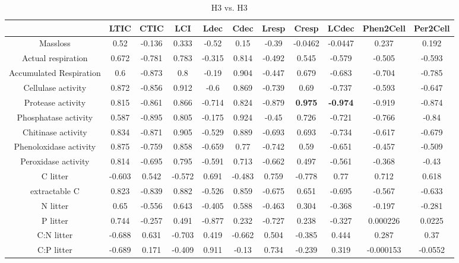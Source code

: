 \documentclass[authoryear,preprint,review,12pt]{elsarticle}
\begin{document}
\newpage
\begin{table}[h!]
\begin{center}
\caption{H3 vs. H3}
\label{morecorr2}
{\tiny
\begin{tabular}{ccccccccccc}
  \hline
 & LTIC & CTIC & LCI & Ldec & Cdec & Lresp & Cresp & LCdec & Phen2Cell & Per2Cell \\ 
  \hline
Massloss & 0.52 & -0.136 & 0.333 & -0.52 & 0.15 & -0.39 & -0.0462 & -0.0447 & 0.237 & 0.192 \\ 
  Actual respiration & 0.672 & -0.781 & 0.783 & -0.315 & 0.814 & -0.492 & 0.545 & -0.579 & -0.505 & -0.593 \\ 
  Accumulated Respiration &  0.6 & -0.873 &  0.8 & -0.19 & 0.904 & -0.447 & 0.679 & -0.683 & -0.704 & -0.785 \\ 
  Cellulase activity & 0.872 & -0.856 & 0.912 & -0.6 & 0.869 & -0.739 & 0.69 & -0.737 & -0.593 & -0.647 \\ 
  Protease activity & 0.815 & -0.861 & 0.866 & -0.714 & 0.824 & -0.879 & \textbf{ 0.975 } & \textbf{ -0.974 } & -0.919 & -0.874 \\ 
  Phosphatase activity & 0.587 & -0.895 & 0.805 & -0.175 & 0.924 & -0.45 & 0.726 & -0.721 & -0.766 & -0.84 \\ 
  Chitinase activity & 0.834 & -0.871 & 0.905 & -0.529 & 0.889 & -0.693 & 0.693 & -0.734 & -0.617 & -0.679 \\ 
  Phenoloxidase activity & 0.875 & -0.759 & 0.858 & -0.659 & 0.77 & -0.742 & 0.59 & -0.651 & -0.457 & -0.509 \\ 
  Peroxidase activity & 0.814 & -0.695 & 0.795 & -0.591 & 0.713 & -0.662 & 0.497 & -0.561 & -0.368 & -0.43 \\ 
  C litter & -0.603 & 0.542 & -0.572 & 0.691 & -0.483 & 0.759 & -0.778 & 0.77 & 0.712 & 0.618 \\ 
  extractable C & 0.823 & -0.839 & 0.882 & -0.526 & 0.859 & -0.675 & 0.651 & -0.695 & -0.567 & -0.633 \\ 
  N litter & 0.65 & -0.556 & 0.643 & -0.405 & 0.588 & -0.463 & 0.304 & -0.368 & -0.197 & -0.281 \\ 
  P litter & 0.744 & -0.257 & 0.491 & -0.877 & 0.232 & -0.727 & 0.238 & -0.327 & 0.000226 & 0.0225 \\ 
  C:N litter & -0.688 & 0.631 & -0.703 & 0.419 & -0.662 & 0.504 & -0.385 & 0.444 & 0.287 & 0.37 \\ 
  C:P litter & -0.689 & 0.171 & -0.409 & 0.911 & -0.13 & 0.734 & -0.239 & 0.319 & -0.000153 & -0.0552 \\ 

\end{tabular}}
\end{center}
\end{table}
\end{document}
